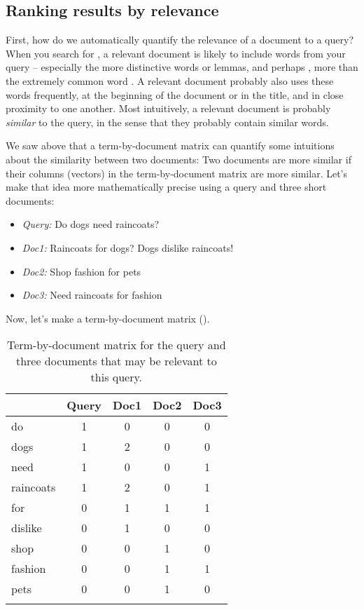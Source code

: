 \subsection{Ranking results by relevance}

First, how do we automatically quantify the relevance of a document to a query?  When you search for , a relevant document is likely to  include words from your query -- especially the more distinctive words or lemmas,  and perhaps , more than the extremely common word .  A relevant document probably also uses these words frequently, at the beginning of the document or in the title, and in close proximity to one another.  Most intuitively, a relevant document is probably \emph{similar} to the query, in the sense that they probably contain similar words.

\newpage
We saw above that a term-by-document matrix can quantify some intuitions about the similarity between two documents: Two documents are more similar if their columns (vectors) in the term-by-document matrix are more similar.  Let's make that idea more mathematically precise using a  query and three short documents:


\begin{itemize}

\item \emph{Query:} Do dogs need raincoats?

\item \emph{Doc1:} Raincoats for dogs?  Dogs dislike raincoats!

\item \emph{Doc2:} Shop fashion for pets

\item \emph{Doc3:} Need raincoats for fashion

\end{itemize}


Now, let's make a term-by-document matrix ().  

\begin{table}
\begin{tabular}{l c c c c } %
\lsptoprule
  & Query & Doc1 & Doc2 & Doc3  \\ \midrule
  do & 1 	& 0 		& 0 	& 0  \\
  dogs & 1 & 2 & 0 & 0 \\
  need & 1 & 0 & 0  & 1 \\
  raincoats & 1 & 2 & 0 & 1 \\
  for & 0 & 1 & 1 & 1 \\
  dislike & 0 & 1 & 0 & 0 \\
  shop & 0 & 0 & 1 & 0 \\
  fashion & 0 & 0 & 1 & 1 \\
  pets & 0 & 0 & 1 & 0 \\ 
\lspbottomrule
  \end{tabular}
  \caption{Term-by-document matrix for the query  and three documents that may be relevant to this query.}
  \label{termdocdog}
  \end{table}


